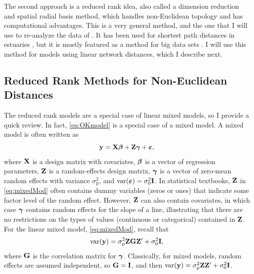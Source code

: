 \documentclass[11pt, titlepage]{article}\usepackage[]{graphicx}\usepackage[]{color}
\begin{document}
\begin{spacing}{1.9}
\begin{flushleft}
The second approach is a reduced rank idea, also called a dimension reduction \citep{Wikl:Cres:dime:1999} and spatial radial basis \citep{Lin:Chen:spat:2004, Hefl:Brom:Bros:Bude:basi:2016} method, which handles non-Euclidean topology and has computational advantages.  This is a very general method, and the one that I will use to re-analyze the data of \citet{Ladl:Avga:Whea:Boyc:pred:2016}.  It has been used for shortest path distances in estuaries \citep{Wang:Rana:low:2007}, but it is mostly featured as a method for big data sets \citep[e.g.][]{Wikl:Cres:dime:1999, Rupp:Wand:Carr:semi:2003, Cres:Gard:fixe:2008,Bane:Gelf:Finl:Sang:gaus:2008}.  I will use this method for models using linear network distances, which I describe next.


\subsection*{Reduced Rank Methods for Non-Euclidean Distances}

The reduced rank models are a special case of linear mixed models, so I provide a quick review. In fact, \ref{eq:OKmodel} is a special case of a mixed model. A mixed model is often written as
\begin{equation} \label{eq:mixedMod}
    \mathbf{y} = \mathbf{X}{\boldsymbol{\beta}} + \mathbf{Z}\mbox{\boldmath $\gamma$} + \mbox{\boldmath $\varepsilon$},
\end{equation}
 where $\mathbf{X}$ is a design matrix with covariates, ${\boldsymbol{\beta}}$ is a vector of regression parameters, $\mathbf{Z}$ is a random-effects design matrix, $\mbox{\boldmath $\gamma$}$ is a vector of zero-mean random effects with variance $\sigma^2_\textrm{p}$, and $\textrm{var}(\mbox{\boldmath $\varepsilon$}) = \sigma^2_0 \mathbf{I}$.  In statistical textbooks, $\mathbf{Z}$ in \ref{eq:mixedMod} often contains dummy variables (zeros or ones) that indicate some factor level of the random effect.  However, $\mathbf{Z}$ can also contain covariates, in which case $\mbox{\boldmath $\gamma$}$ contains random effects for the slope of a line, illustrating that there are no restrictions on the types of values (continuous or categorical) contained in $\mathbf{Z}$. For the linear mixed model, \ref{eq:mixedMod}, recall that
 \begin{equation} \label{eq:varMixedMod}
 \textrm{var}(\mathbf{y}) = \sigma^2_\textrm{p}\mathbf{Z}\mathbf{G}\mathbf{Z}^{\prime} + \sigma^2_0\mathbf{I}, 
 \end{equation}
 where $\mathbf{G}$ is the correlation matrix for $\mbox{\boldmath $\gamma$}$.  Classically, for mixed models, random effects are assumed independent, so $\mathbf{G} = \mathbf{I}$, and then $\textrm{var}(\mathbf{y}) = \sigma^2_\textrm{p}\mathbf{Z}\mathbf{Z}^{\prime} + \sigma^2_0\mathbf{I}$.  


\end{flushleft}
\end{spacing}
\end{document}
